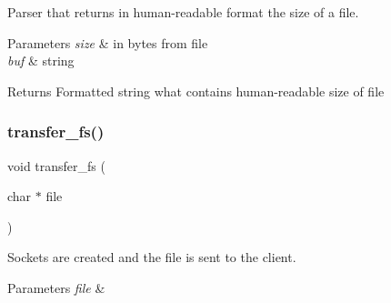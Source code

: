 Parser that returns in human-\/readable format the size of a file. 


\begin{DoxyParams}{Parameters}
{\em size} & in bytes from file \\
\hline
{\em buf} & string \\
\hline
\end{DoxyParams}
\begin{DoxyReturn}{Returns}
Formatted string what contains human-\/readable size of file 
\end{DoxyReturn}
\mbox{\label{fileserv_8c_a5ea0687811fad6f1c67348a52ec2bb7a}} 
\subsubsection{transfer\+\_\+fs()}
{\footnotesize\ttfamily void transfer\+\_\+fs (\begin{DoxyParamCaption}\item[{char $\ast$}]{file }\end{DoxyParamCaption})}



Sockets are created and the file is sent to the client. 


\begin{DoxyParams}{Parameters}
{\em file} & \\
\hline
\end{DoxyParams}

